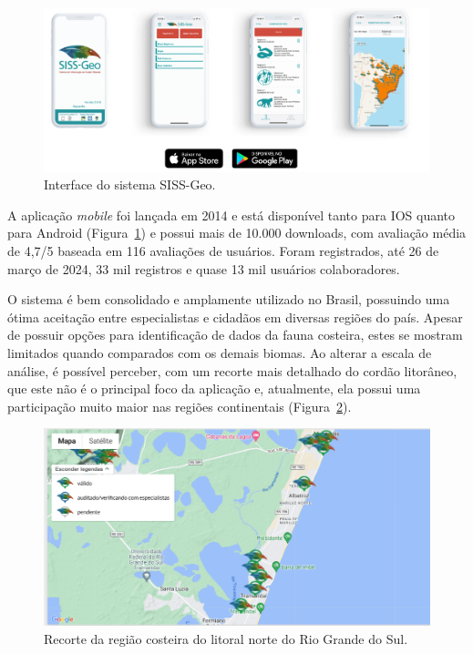 \begin{figure}[htb]
  \centering
  \includegraphics[width=1\textwidth]{imagens/sisGeoApp.png}
  \caption{Interface do sistema SISS-Geo.}
  \label{fig:sisgeoApp}
\end{figure}

A aplicação \textit{mobile} foi lançada em 2014 e está disponível tanto para IOS quanto para Android (Figura~\ref{fig:sisgeoApp}) e possui mais de 10.000 downloads, com avaliação média de 4,7/5 baseada em 116 avaliações de usuários. Foram registrados, até 26 de março de 2024, 33 mil registros e quase 13 mil usuários colaboradores.

O sistema é bem consolidado e amplamente utilizado no Brasil, possuindo uma ótima aceitação entre especialistas e cidadãos em diversas regiões do país. Apesar de possuir opções para identificação de dados da fauna costeira, estes se mostram limitados quando comparados com os demais biomas. Ao alterar a escala de análise, é possível perceber, com um recorte mais detalhado do cordão litorâneo, que este não é o principal foco da aplicação e, atualmente, ela possui uma participação muito maior nas regiões continentais (Figura~\ref{fig:sisgeoMap}).

\begin{figure}[htb]
  \centering
  \includegraphics[width=1\textwidth]{imagens/sisGeoMapa.png}
  \caption{Recorte da região costeira do litoral norte do Rio Grande do Sul.}
  \label{fig:sisgeoMap}
\end{figure}

